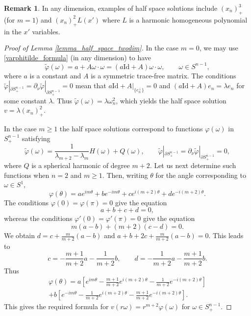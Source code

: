 \documentclass[11pt,a4paper]{amsart}
\theoremstyle{definition}
\newtheorem{Remark}[Theorem]{Remark}
\numberwithin{equation}{section}
\newcommand{\p}{\partial}
\begin{document}
\begin{Remark}
In any dimension, examples of half space solutions include $(x_n)_+^3$ (for $m=1$) and $(x_n)_+^2 L(x')$ where $L$ is a harmonic homogeneous polynomial in the $x'$ variables.
\end{Remark}

\begin{proof}[Proof of Lemma \ref{lemma_half_space_twodim}]
In the case $m=0$, we may use \eqref{varphitilde_formula} (in any dimension) to have 
\[
\tilde{\varphi}(\omega) = a + A \omega \cdot \omega = (a \mathrm{Id} + A) \omega \cdot \omega, \qquad \omega \in S^{n-1},
\]
where $a$ is a constant and $A$ is a symmetric trace-free matrix. The conditions $\tilde{\varphi}|_{\p S^{n-1}_+} = \p_{\nu} \tilde{\varphi}|_{\p S^{n-1}_+} = 0$ mean that $a \mathrm{Id} + A|_{\{ e_n^{\perp} \}} = 0$ and $(a \mathrm{Id} + A) e_n = \lambda e_n$ for some constant $\lambda$. Thus $\tilde{\varphi}(\omega) = \lambda \omega_n^2$, which yields the half space solution $v = \lambda (x_n)_+^2$.

In the case $m \geq 1$ the half space solutions correspond to functions $\varphi(\omega)$ in $S^{n-1}_+$ satisfying 
\[
\tilde{\varphi}(\omega) = \frac{1}{\lambda_{m+2}-\lambda_m} H(\omega) + Q(\omega), \qquad \tilde{\varphi}|_{\p S^{n-1}_+} = \p_{\nu} \tilde{\varphi}|_{\p S^{n-1}_+} = 0,
\]
where $Q$ is a spherical harmonic of degree $m+2$. Let us next determine such functions when $n=2$ and $m \geq 1$. Then, writing $\theta$ for the angle corresponding to $\omega \in S^1$, 
\[
\varphi(\theta) = a e^{im\theta} + b e^{-im\theta} + c e^{i(m+2)\theta} + d e^{-i(m+2)\theta}.
\]
The conditions $\varphi(0) = \varphi(\pi) = 0$ give the equation 
\[
a+b+c+d=0,
\]
whereas the conditions $\varphi'(0) = \varphi'(\pi) = 0$ give the equation 
\[
m(a-b) + (m+2)(c-d) = 0.
\]
We obtain $d = c + \frac{m}{m+2}(a-b)$ and $a+b+2c+\frac{m}{m+2}(a-b)=0$. This leads to 
\[
c = -\frac{m+1}{m+2} a - \frac{1}{m+2} b, \qquad d = - \frac{1}{m+2} a - \frac{m+1}{m+2} b.
\]
Thus 
\begin{multline*}
\varphi(\theta) = a \left[ e^{im\theta} -\frac{m+1}{m+2} e^{i(m+2)\theta} - \frac{1}{m+2} e^{-i(m+2)\theta} \right] \\
 + b \left[ e^{-im\theta} - \frac{1}{m+2} e^{i(m+2)\theta} - \frac{m+1}{m+2} e^{-i(m+2)\theta} \right].
\end{multline*}
This gives the required formula for $v(r\omega) = r^{m+2} \varphi(\omega)$ for $\omega \in S^{n-1}_+$.
\end{proof}
\end{document}
